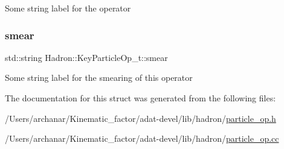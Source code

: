 Some string label for the operator \mbox{\label{structHadron_1_1KeyParticleOp__t_a5bf85aa6188a5ea919dd6fc935ef0eb5}} 
\subsubsection{\texorpdfstring{smear}{smear}}
{\footnotesize\ttfamily std\+::string Hadron\+::\+Key\+Particle\+Op\+\_\+t\+::smear}

Some string label for the smearing of this operator 

The documentation for this struct was generated from the following files\+:\begin{DoxyCompactItemize}
\item 
/\+Users/archanar/\+Kinematic\+\_\+factor/adat-\/devel/lib/hadron/\mbox{\hyperlink{adat-devel_2lib_2hadron_2particle__op_8h}{particle\+\_\+op.\+h}}\item 
/\+Users/archanar/\+Kinematic\+\_\+factor/adat-\/devel/lib/hadron/\mbox{\hyperlink{adat-devel_2lib_2hadron_2particle__op_8cc}{particle\+\_\+op.\+cc}}\end{DoxyCompactItemize}
